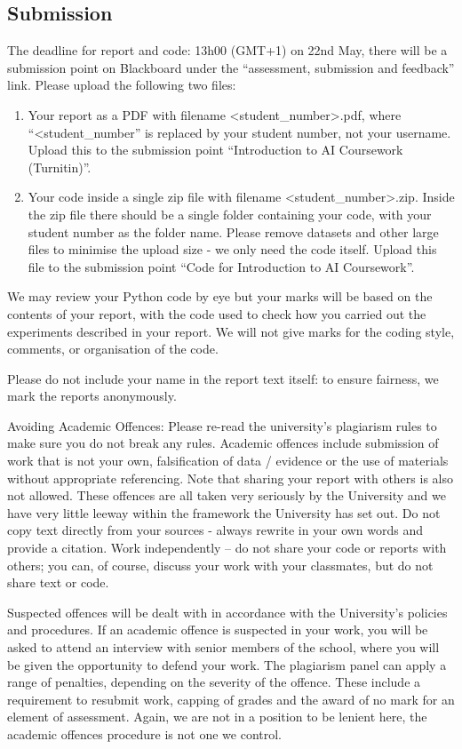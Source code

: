 \documentclass[12pt]{article}
\begin{document}
\subsection*{Submission}

The deadline for report and code: 13h00 (GMT+1) on 22nd May, there
will be a submission point on Blackboard under the ``assessment,
submission and feedback'' link. Please upload the following two files:
\begin{enumerate}
\item Your report as a PDF with filename <student\_number>.pdf, where ``<student\_number'' is replaced by your student number, not your username. Upload this to the submission point ``Introduction to AI Coursework (Turnitin)''.
\item Your code inside a single zip file with filename
  <student\_number>.zip. Inside the zip file there should be a single
  folder containing your code, with your student number as the folder
  name. Please remove datasets and other large files to minimise the
  upload size - we only need the code itself. Upload this file to the
  submission point ``Code for Introduction to AI Coursework''.
\end{enumerate}
  
We may review your Python code by eye but your marks will be based on
the contents of your report, with the code used to check how you
carried out the experiments described in your report. We will not give
marks for the coding style, comments, or organisation of the code.

Please do not include your name in the report text itself: to ensure fairness, we mark the reports anonymously.

Avoiding Academic Offences: Please re-read the university's plagiarism
rules to make sure you do not break any rules. Academic offences
include submission of work that is not your own, falsification of data
/ evidence or the use of materials without appropriate
referencing. Note that sharing your report with others is also not
allowed. These offences are all taken very seriously by the University
and we have very little leeway within the framework the University has
set out. Do not copy text directly from your sources - always rewrite
in your own words and provide a citation. Work independently -- do not
share your code or reports with others; you can, of course, discuss
your work with your classmates, but do not share text or code.

Suspected offences will be dealt with in accordance with the
University's policies and procedures. If an academic offence is
suspected in your work, you will be asked to attend an interview with
senior members of the school, where you will be given the opportunity
to defend your work. The plagiarism panel can apply a range of
penalties, depending on the severity of the offence. These include a
requirement to resubmit work, capping of grades and the award of no
mark for an element of assessment. Again, we are not in a position to
be lenient here, the academic offences procedure is not one we control.
\end{document}
